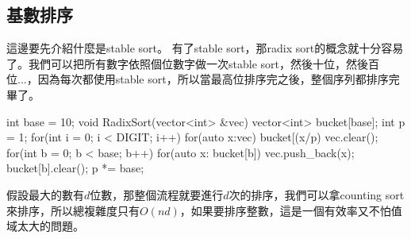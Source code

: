 \subsection{基數排序}
這邊要先介紹什麼是stable sort。
有了stable sort，那radix sort的概念就十分容易了。我們可以把所有數字依照個位數字做一次stable sort，然後十位，然後百位...，因為每次都使用stable sort，所以當最高位排序完之後，整個序列都排序完畢了。
\begin{C++}
int base = 10;
void RadixSort(vector<int> &vec){
    vector<int> bucket[base];
    int p = 1;
    for(int i = 0; i < DIGIT; i++){
        for(auto x:vec)
            bucket[(x/p)%
        vec.clear();
        for(int b = 0; b < base; b++){
            for(auto x: bucket[b])
                vec.push_back(x);
            bucket[b].clear();
        }
        p *= base;
    }
}
\end{C++}
假設最大的數有$d$位數，那整個流程就要進行$d$次的排序，我們可以拿counting sort來排序，所以總複雜度只有$O(nd)$，如果要排序整數，這是一個有效率又不怕值域太大的問題。

